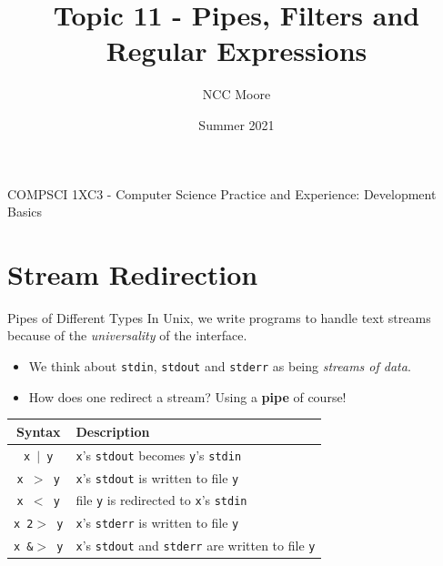 \documentclass[11pt]{beamer}
\author{NCC Moore}
\title{Topic 11 - Pipes, Filters and Regular Expressions }
\institute{McMaster University}
\date{Summer 2021}
\begin{document}
\begin{frame}
\center
COMPSCI 1XC3 - Computer Science Practice and Experience:
Development Basics
\titlepage
\end{frame}

\begin{frame}
\tableofcontents
\end{frame}

\section[Pipes]{Stream Redirection}
\begin{frame}{Pipes of Different Types}
In Unix, we write programs to handle text streams because of the \emph{universality} of the interface.  
\begin{itemize}
\item We think about \texttt{stdin}, \texttt{stdout} and \texttt{stderr} as being \emph{streams of data}. 
\item How does one redirect a stream?  Using a \textbf{pipe} of course! 
\end{itemize}
\center
\begin{tabular}{| c | l |}
\hline 
Syntax & Description \\ \hline
\texttt{x $|$ y} & \texttt{x}'s \texttt{stdout} becomes  \texttt{y}'s \texttt{stdin}\\ \hline
\texttt{x $>$ y} & \texttt{x}'s \texttt{stdout} is written to file \texttt{y} \\ \hline
\texttt{x $<$ y} & file \texttt{y} is redirected to \texttt{x}'s \texttt{stdin} \\ \hline
\texttt{x 2$>$ y} & \texttt{x}'s \texttt{stderr} is written to file \texttt{y} \\ \hline 
\texttt{x \&$>$ y} & \texttt{x}'s \texttt{stdout} and \texttt{stderr} are written to file \texttt{y} \\ \hline 
\end{tabular}

\end{frame}
\end{document}
